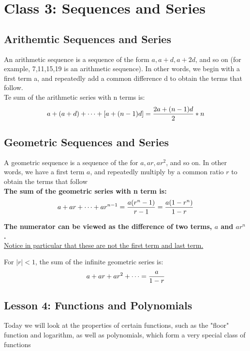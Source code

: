 \documentclass[10pt]{article}
\theoremstyle{remark}
\begin{document}
\newpage
\section{Class 3: Sequences and Series}

\subsection{Arithemtic Sequences and Series}
An arithmetic sequence is a sequence of the form $a,a+d,a+2d$, and so on (for example, 7,11,15,19 is an arithmetic sequence).
In other words, we begin with a first term a, and repeatedly add a common difference d to obtain the terms that follow.
\\

Te sum of the arithmetic series with n terms is:
\begin{equation}
	a + (a + d) + \cdots + [a + (n - 1)d] = {{2a + (n - 1)d} \over 2} * n
\end{equation}

\subsection{Geometric Sequences and Series}

A geometric sequence is a sequence of the for $a, ar, ar^2$, and so on. 
In other words, we have a first term $a$, and repeatedly multiply by a common ratio $r$ to obtain the terms that follow
\\

\textbf{The sum of the geometric series with n term is: }
\begin{equation}
	a + ar + \cdots + ar^{n - 1} = {{a(r^n - 1)} \over r - 1} = {{a(1 - r^{n})} \over {1 - r}}
\end{equation}

\textbf{The numerator can be viewed as the difference of two terms, $a$ and $ar^n$.}\\
\underline{Notice in particular that these are not the first term and last term.}
\newline

For $|r| < 1$, the sum of the infinite geometric series is:
$$a + ar + ar^2 + \cdots = {a \over {1 - r}}$$ 
\newpage
\begin{center}
\section{Lesson 4: Functions and Polynomials}
\end{center}
Today we will look at the properties of certain functions, such as the "floor" function and logarithm, as well as polynomials,
which form a very special class of functions
\newline
\end{document}
